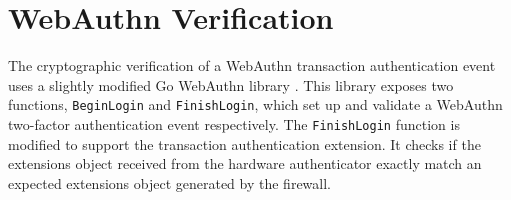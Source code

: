 




\section{WebAuthn Verification}\label{Sec:WebauthnVerification}

The cryptographic verification of a WebAuthn transaction authentication event uses a slightly modified Go WebAuthn library \cite{webauthn-library}. This library exposes two functions, \lstinline{BeginLogin} and \lstinline{FinishLogin}, which set up and validate a WebAuthn two-factor authentication event respectively. The \lstinline{FinishLogin} function is modified to support the transaction authentication extension. It checks if the extensions object received from the hardware authenticator exactly match an expected extensions object generated by the firewall.


